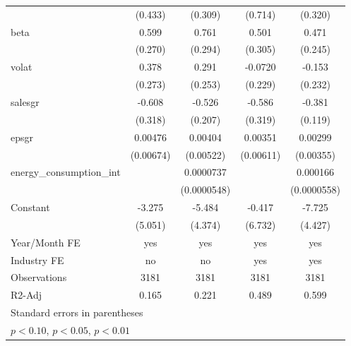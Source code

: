 \begin{table}[htbp]
\begin{tabular}{l*{4}{c}}
                    &     (0.433)         &     (0.309)         &     (0.714)         &     (0.320)         \\
[1em]
beta                &       0.599\sym{**} &       0.761\sym{**} &       0.501         &       0.471\sym{*}  \\
                    &     (0.270)         &     (0.294)         &     (0.305)         &     (0.245)         \\
[1em]
volat               &       0.378         &       0.291         &     -0.0720         &      -0.153         \\
                    &     (0.273)         &     (0.253)         &     (0.229)         &     (0.232)         \\
[1em]
salesgr             &      -0.608\sym{*}  &      -0.526\sym{**} &      -0.586\sym{*}  &      -0.381\sym{***}\\
                    &     (0.318)         &     (0.207)         &     (0.319)         &     (0.119)         \\
[1em]
epsgr               &     0.00476         &     0.00404         &     0.00351         &     0.00299         \\
                    &   (0.00674)         &   (0.00522)         &   (0.00611)         &   (0.00355)         \\
[1em]
energy\_consumption\_int&                     &   0.0000737         &                     &    0.000166\sym{***}\\
                    &                     & (0.0000548)         &                     & (0.0000558)         \\
[1em]
Constant            &      -3.275         &      -5.484         &      -0.417         &      -7.725\sym{*}  \\
                    &     (5.051)         &     (4.374)         &     (6.732)         &     (4.427)         \\
\hline
Year/Month FE       &         yes         &         yes         &         yes         &         yes         \\
Industry FE         &          no         &          no         &         yes         &         yes         \\
Observations        &        3181         &        3181         &        3181         &        3181         \\
R2-Adj              &       0.165         &       0.221         &       0.489         &       0.599         \\
\hline\hline
\multicolumn{5}{l}{\footnotesize Standard errors in parentheses}\\
\multicolumn{5}{l}{\footnotesize \sym{*} \(p<0.10\), \sym{**} \(p<0.05\), \sym{***} \(p<0.01\)}\\
\end{tabular}
\end{table}
